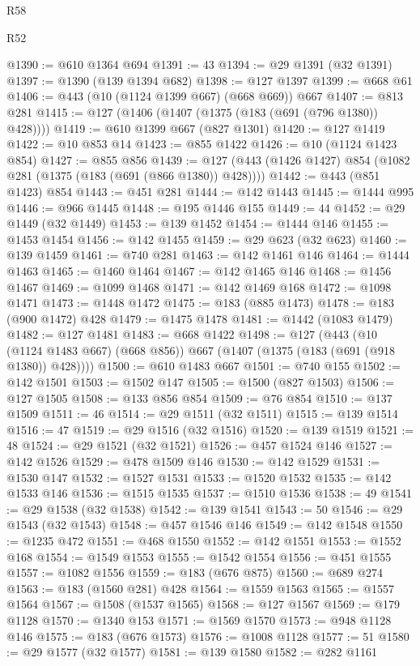 \begin{lexlean}{R58}
\begin{lexlean}{R52}
\begin{coremodule}
{{{{{{{{{{{{{{{{{{{{{{{{{{{{{{{{{{{{{{{{{{{{{{{{{{{{{{{{{{{{{{{{{{{{{{{{{{{{{{{{{{{{{{{{{{{{{{{{{{{{{{{{{{{{{{{{{{{{{{{{{{{{{{{{{{{{{{{{{{{{{{{{{{{{{{{{{{{{{{{{{{{{{{{{{{{{{{{{{{{{{{{{{{{{{{{{{{{{{{@1390 := @610 @1364 @694
@1391 := 43
@1394 := @29 @1391 (@32 @1391)
@1397 := @1390 (@139 @1394 @682)
@1398 := @127 @1397
@1399 := @668 @61
@1406 := @443 (@10 (@1124 @1399 @667) (@668 @669)) @667
@1407 := @813 @281
@1415 := @127 (@1406 (@1407 (@1375 (@183 (@691 (@796 @1380)) @428))))
@1419 := @610 @1399 @667 (@827 @1301)
@1420 := @127 @1419
@1422 := @10 @853 @14
@1423 := @855 @1422
@1426 := @10 (@1124 @1423 @854)
@1427 := @855 @856
@1439 := @127 (@443 (@1426 @1427) @854 (@1082 @281 (@1375 (@183 (@691 (@866 @1380)) @428))))
@1442 := @443 (@851 @1423) @854
@1443 := @451 @281
@1444 := @142 @1443
@1445 := @1444 @995
@1446 := @966 @1445
@1448 := @195 @1446 @155
@1449 := 44
@1452 := @29 @1449 (@32 @1449)
@1453 := @139 @1452
@1454 := @1444 @146
@1455 := @1453 @1454
@1456 := @142 @1455
@1459 := @29 @623 (@32 @623)
@1460 := @139 @1459
@1461 := @740 @281
@1463 := @142 @1461 @146
@1464 := @1444 @1463
@1465 := @1460 @1464
@1467 := @142 @1465 @146
@1468 := @1456 @1467
@1469 := @1099 @1468
@1471 := @142 @1469 @168
@1472 := @1098 @1471
@1473 := @1448 @1472
@1475 := @183 (@885 @1473)
@1478 := @183 (@900 @1472) @428
@1479 := @1475 @1478
@1481 := @1442 (@1083 @1479)
@1482 := @127 @1481
@1483 := @668 @1422
@1498 := @127
    (@443 (@10 (@1124 @1483 @667) (@668 @856)) @667 (@1407 (@1375 (@183 (@691 (@918 @1380)) @428))))
@1500 := @610 @1483 @667
@1501 := @740 @155
@1502 := @142 @1501
@1503 := @1502 @147
@1505 := @1500 (@827 @1503)
@1506 := @127 @1505
@1508 := @133 @856 @854
@1509 := @76 @854
@1510 := @137 @1509
@1511 := 46
@1514 := @29 @1511 (@32 @1511)
@1515 := @139 @1514
@1516 := 47
@1519 := @29 @1516 (@32 @1516)
@1520 := @139 @1519
@1521 := 48
@1524 := @29 @1521 (@32 @1521)
@1526 := @457 @1524 @146
@1527 := @142 @1526
@1529 := @478 @1509 @146
@1530 := @142 @1529
@1531 := @1530 @147
@1532 := @1527 @1531
@1533 := @1520 @1532
@1535 := @142 @1533 @146
@1536 := @1515 @1535
@1537 := @1510 @1536
@1538 := 49
@1541 := @29 @1538 (@32 @1538)
@1542 := @139 @1541
@1543 := 50
@1546 := @29 @1543 (@32 @1543)
@1548 := @457 @1546 @146
@1549 := @142 @1548
@1550 := @1235 @472
@1551 := @468 @1550
@1552 := @142 @1551
@1553 := @1552 @168
@1554 := @1549 @1553
@1555 := @1542 @1554
@1556 := @451 @1555
@1557 := @1082 @1556
@1559 := @183 (@676 @875)
@1560 := @689 @274
@1563 := @183 (@1560 @281) @428
@1564 := @1559 @1563
@1565 := @1557 @1564
@1567 := @1508 (@1537 @1565)
@1568 := @127 @1567
@1569 := @179 @1128
@1570 := @1340 @153
@1571 := @1569 @1570
@1573 := @948 @1128 @146
@1575 := @183 (@676 @1573)
@1576 := @1008 @1128
@1577 := 51
@1580 := @29 @1577 (@32 @1577)
@1581 := @139 @1580
@1582 := @282 @1161
}}}}}}}}}}}}}}}}}}}}}}}}}}}}}}}}}}}}}}}}}}}}}}}}}}}}}}}}}}}}}}}}}}}}}}}}}}}}}}}}}}}}}}}}}}}}}}}}}}}}}}}}}}}}}}}}}}}}}}}}}}}}}}}}}}}}}}}}}}}}}}}}}}}}}}}}}}}}}}}}}}}}}}}}}}}}}}}}}}}}}}}}}}}}}}}}}}}}}}
\end{coremodule}
\end{lexlean}
\end{lexlean}
